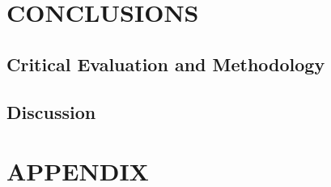 \documentclass[a4paper, 10pt]{article}
\begin{document}
\section{CONCLUSIONS}

\subsection{Critical Evaluation and Methodology}

%

\subsection{Discussion}

%


\nocite{*}




\clearpage
\section*{APPENDIX}

\begin{lstlisting}[language = C++]

\end{lstlisting}
\end{document}
